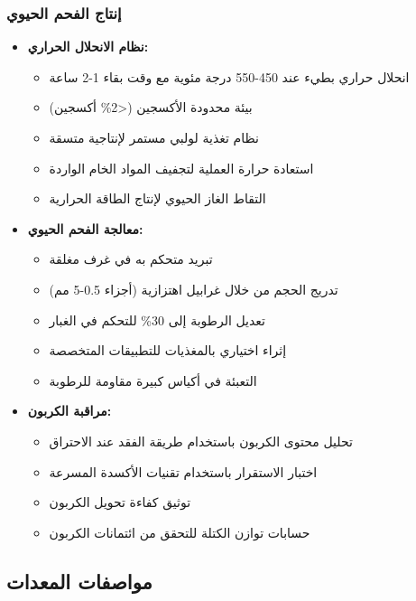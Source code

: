 \subsubsection{إنتاج الفحم الحيوي}
\begin{itemize}
    \item \textbf{نظام الانحلال الحراري:}
    \begin{itemize}
        \item انحلال حراري بطيء عند 450-550 درجة مئوية مع وقت بقاء 1-2 ساعة
        \item بيئة محدودة الأكسجين (<2\% أكسجين)
        \item نظام تغذية لولبي مستمر لإنتاجية متسقة
        \item استعادة حرارة العملية لتجفيف المواد الخام الواردة
        \item التقاط الغاز الحيوي لإنتاج الطاقة الحرارية
    \end{itemize}
    
    \item \textbf{معالجة الفحم الحيوي:}
    \begin{itemize}
        \item تبريد متحكم به في غرف مغلقة
        \item تدريج الحجم من خلال غرابيل اهتزازية (أجزاء 0.5-5 مم)
        \item تعديل الرطوبة إلى 30\% للتحكم في الغبار
        \item إثراء اختياري بالمغذيات للتطبيقات المتخصصة
        \item التعبئة في أكياس كبيرة مقاومة للرطوبة
    \end{itemize}
    
    \item \textbf{مراقبة الكربون:}
    \begin{itemize}
        \item تحليل محتوى الكربون باستخدام طريقة الفقد عند الاحتراق
        \item اختبار الاستقرار باستخدام تقنيات الأكسدة المسرعة
        \item توثيق كفاءة تحويل الكربون
        \item حسابات توازن الكتلة للتحقق من ائتمانات الكربون
    \end{itemize}
\end{itemize}

\subsection{مواصفات المعدات}

